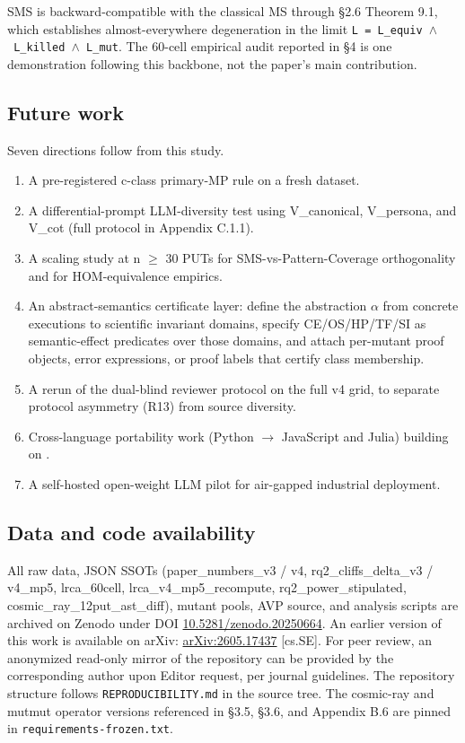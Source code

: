 \documentclass[acmsmall,screen,review]{acmart}
\begin{document}
SMS is backward-compatible with the classical MS through §2.6 Theorem
9.1, which establishes almost-everywhere degeneration in the limit
\texttt{L\ =\ L\_equiv\ $\wedge$\ L\_killed\ $\wedge$\ L\_mut}. The 60-cell empirical
audit reported in §4 is one demonstration following this backbone, not
the paper's main contribution.

\subsection{Future work}\label{future-work-and-p-series-roadmap}

Seven directions follow from this study.

\begin{enumerate}
\def\labelenumi{(\alph{enumi})}
\item
  A pre-registered c-class primary-MP rule on a fresh dataset.
\item
  A differential-prompt LLM-diversity test using V\_canonical,
  V\_persona, and V\_cot (full protocol in Appendix C.1.1).
\item
  A scaling study at n $\geq$ 30 PUTs for SMS-vs-Pattern-Coverage
  orthogonality and for HOM-equivalence empirics.
\item
  An abstract-semantics certificate layer: define the abstraction
  $\alpha$ from concrete executions to scientific invariant domains,
  specify CE/OS/HP/TF/SI as semantic-effect predicates over those
  domains, and attach per-mutant proof objects, error expressions, or
  proof labels that certify class membership.
\item
  A rerun of the dual-blind reviewer protocol on the full v4 grid, to
  separate protocol asymmetry (R13) from source diversity.
\item
  Cross-language portability work (Python $\to$ JavaScript and Julia)
  building on \citet{tip2025llmorpheus}.
\item
  A self-hosted open-weight LLM pilot for air-gapped industrial
  deployment.
\end{enumerate}


\subsection{Data and code availability}\label{data-and-code-availability}

All raw data, JSON SSOTs (paper\_numbers\_v3 / v4,
rq2\_cliffs\_delta\_v3 / v4\_mp5, lrca\_60cell,
lrca\_v4\_mp5\_recompute, rq2\_power\_stipulated,
cosmic\_ray\_12put\_ast\_diff), mutant pools, AVP source, and analysis
scripts are archived on Zenodo under DOI
\href{https://doi.org/10.5281/zenodo.20250664}{10.5281/zenodo.20250664}.
An earlier version of this work is available on arXiv:
\href{https://arxiv.org/abs/2605.17437}{arXiv:2605.17437} [cs.SE].
For peer review, an anonymized read-only mirror of the repository can
be provided by the corresponding author upon Editor request, per journal
guidelines. The repository structure follows
\texttt{REPRODUCIBILITY.md} in the source tree. The cosmic-ray and
mutmut operator versions referenced in §3.5, §3.6, and Appendix B.6 are
pinned in \texttt{requirements-frozen.txt}.
\end{document}
